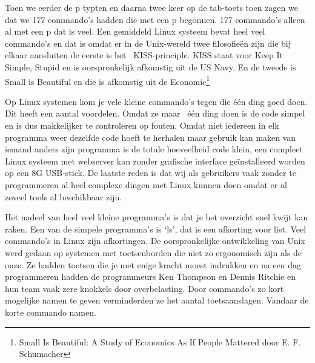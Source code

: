 Toen we eerder de p typten en daarna twee keer op de tab-toets toen zagen we dat we 177 commando's hadden die met een p
begonnen. 177 commando's alleen al met een p dat is veel. Een gemiddeld Linux systeem bevat heel veel commando's en dat
is omdat er in de Unix-wereld twee filosofie\"en zijn die bij elkaar aansluiten de eerste is het \ KISS-principle. KISS
staat voor Keep It Simple, Stupid en is oorspronkelijk afkomstig uit de US Navy. En de tweede is Small is Beautiful en
die is afkomstig uit de Economie\footnote{Small Is Beautiful: A Study of Economics As If People Mattered door E. F.
Schumacher}

Op Linux systemen kom je vele kleine commando's tegen die \'e\'en ding goed doen. Dit heeft een aantal voordelen. Omdat
ze maar \ \'e\'en ding doen is de code simpel en is dus makkelijker te controleren op fouten. Omdat niet iedereen in
elk programma weer dezelfde code hoeft te herhalen maar gebruik kan maken van iemand anders zijn programma is de totale
hoeveelheid code klein, een compleet Linux systeem met webserver kan zonder grafische interface ge\"installeerd worden
op een 8G USB-stick. De laatste reden is dat wij als gebruikers vaak zonder te programmeren al heel complexe dingen met
Linux kunnen doen omdat er al zoveel tools al beschikbaar zijn.

Het nadeel van heel veel kleine programma's is dat je het overzicht snel kwijt kan raken. Een van de simpele programma's
is `ls', dat is een afkorting voor list. Veel commando's in Linux zijn afkortingen. De oorspronkelijke ontwikkeling van
Unix werd gedaan op systemen met toetsenborden die niet zo ergonomisch zijn als de onze. Ze hadden toetsen die je met
enige kracht moest indrukken en na een dag programmeren hadden de programmeurs Ken Thompson en Dennis Ritchie en hun
team vaak zere knokkels door overbelasting. Door commando's zo kort mogelijke namen te geven verminderden ze het aantal
toetsaanslagen. Vandaar de korte commando namen.


